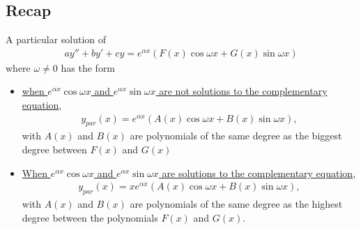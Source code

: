 \documentclass[12pt,a4paper]{article}
\begin{document}
\newpage

\phantom{2}

\newpage

\subsection{Recap}
A particular solution of
	\begin{align*}
	ay'' + by' + cy = e^{\alpha x} \left( F(x) \cos \omega x + G(x) \sin \omega x \right)
	\end{align*}
where $\omega \neq 0$ has the form
	\begin{itemize}
	\item \underline{when $e^{\alpha x} \cos \omega x$ and $e^{\alpha x} \sin \omega x$ are not solutions to the complementary equation}, 
		\begin{align*}
		y_{par} (x) = e^{\alpha x} \left( A(x) \cos \omega x + B(x) \sin \omega x \right),
		\end{align*}
	with $A(x)$ and $B(x)$ are polynomials of the same degree as the biggest degree between $F(x)$ and $G(x)$
	\item \underline{When $e^{\alpha x} \cos \omega x$ and $e^{\alpha x} \sin \omega x$ are solutions to the complementary equation},
		\begin{align*}
		y_{par} (x) = x e^{\alpha x} \left( A(x) \cos \omega x + B(x) \sin \omega x \right),
		\end{align*}
	with $A(x)$ and $B(x)$ are polynomials of the same degree as the highest degree between the polynomials $F(x)$ and $G(x)$.
	\end{itemize}
\end{document}
